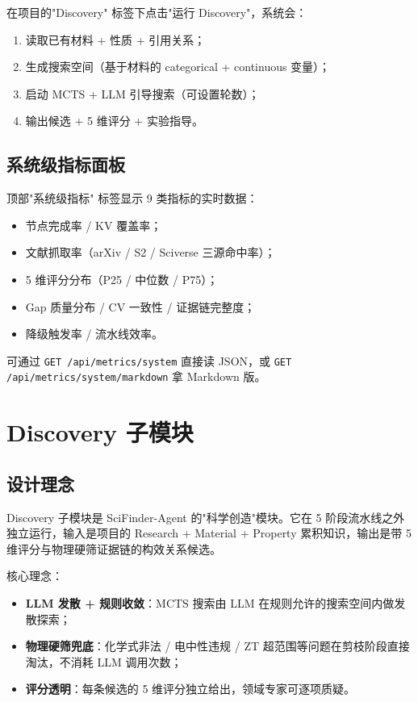 \documentclass[11pt,a4paper]{article}
\begin{document}
在项目的"Discovery" 标签下点击"运行 Discovery"，系统会：
\begin{enumerate}[leftmargin=2em]
\item 读取已有材料 + 性质 + 引用关系；
\item 生成搜索空间（基于材料的 categorical + continuous 变量）；
\item 启动 MCTS + LLM 引导搜索（可设置轮数）；
\item 输出候选 + 5 维评分 + 实验指导。
\end{enumerate}

\subsection{系统级指标面板}

顶部"系统级指标" 标签显示 9 类指标的实时数据：
\begin{itemize}[leftmargin=2em]
\item 节点完成率 / KV 覆盖率；
\item 文献抓取率（arXiv / S2 / Sciverse 三源命中率）；
\item 5 维评分分布（P25 / 中位数 / P75）；
\item Gap 质量分布 / CV 一致性 / 证据链完整度；
\item 降级触发率 / 流水线效率。
\end{itemize}

可通过 \texttt{GET /api/metrics/system} 直接读 JSON，或 \texttt{GET /api/metrics/system/markdown} 拿 Markdown 版。

\section{Discovery 子模块}

\subsection{设计理念}

Discovery 子模块是 SciFinder-Agent 的"科学创造"模块。它在 5 阶段流水线之外独立运行，输入是项目的 Research + Material + Property 累积知识，输出是带 5 维评分与物理硬筛证据链的构效关系候选。

核心理念：
\begin{itemize}[leftmargin=2em]
\item \textbf{LLM 发散 + 规则收敛}：MCTS 搜索由 LLM 在规则允许的搜索空间内做发散探索；
\item \textbf{物理硬筛兜底}：化学式非法 / 电中性违规 / ZT 超范围等问题在剪枝阶段直接淘汰，不消耗 LLM 调用次数；
\item \textbf{评分透明}：每条候选的 5 维评分独立给出，领域专家可逐项质疑。
\end{itemize}
\end{document}
